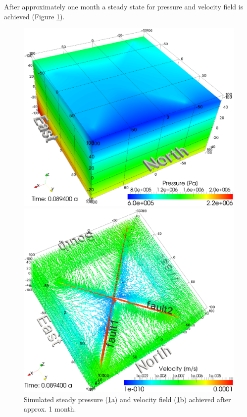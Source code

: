 After approximately one month a steady state for pressure and velocity field is achieved (Figure \ref{fig4}).
\begin{figure}[htbp]
    \begin{center}
        \begin{minipage}{0.40\textwidth}
            \includegraphics[width=1\textwidth]{PART_II/T/2u2f_fig4a.eps}
        \end{minipage}
        \begin{minipage}{0.40\textwidth}
            \includegraphics[width=1\textwidth]{PART_II/T/2u2f_fig4b.eps}
        \end{minipage}
        \caption{Simulated steady pressure (\ref{fig4}a) and velocity field (\ref{fig4}b) achieved after approx. 1 month.}
        \label{fig4}
    \end{center}
\end{figure}

